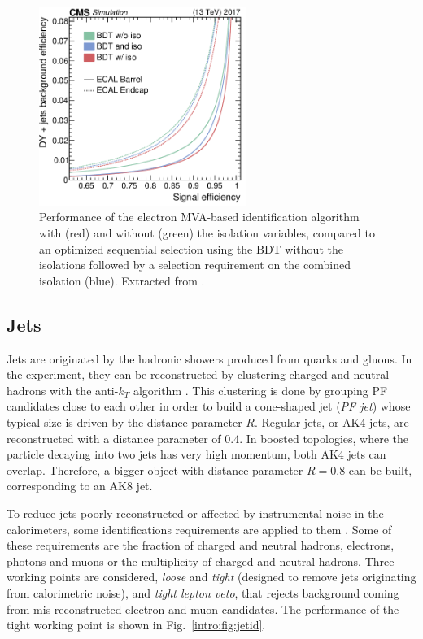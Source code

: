 \documentclass[../main.tex]{subfiles}
\begin{document}
\begin{figure}[h!]
\begin{center}
\includegraphics[width=0.6\textwidth]{Images/ele_mva}
\end{center}
\caption[Performance of the electron MVA-based identification algorithm]{Performance of the electron MVA-based identification algorithm with (red) and without (green) the isolation variables, compared to an optimized sequential selection using the BDT without the isolations followed by a selection requirement on the combined isolation (blue). Extracted from \cite{intro:id:ele_mva}.}
\label{intro:fig:ele_mva}
\end{figure}


\subsection{Jets}
\label{intro:subsec:jets}

Jets are originated by the hadronic showers produced from quarks and gluons. In the experiment, they can be reconstructed by clustering charged and neutral hadrons with the anti-$k_T$ algorithm \cite{intro:id:antikt}. This clustering is done by grouping PF candidates close to each other in order to build a cone-shaped jet (\textit{PF jet}) whose typical size is driven by the distance parameter $R$. Regular jets, or AK4 jets, are reconstructed with a distance parameter of 0.4. In boosted topologies, where the particle decaying into two jets has very high momentum, both AK4 jets can overlap. Therefore, a bigger object with distance parameter $R=0.8$ can be built, corresponding to an AK8 jet. 

To reduce jets poorly reconstructed or affected by instrumental noise in the calorimeters, some identifications requirements are applied to them \cite{intro:id:pfjetid}. Some of these requirements are the fraction of charged and neutral hadrons, electrons, photons and muons or the multiplicity of charged and neutral hadrons. Three working points are considered, \textit{loose} and \textit{tight} (designed to remove jets originating from calorimetric noise), and \textit{tight lepton veto}, that rejects background coming from mis-reconstructed electron and muon candidates. The performance of the tight working point is shown in Fig.~\ref{intro:fig:jetid}.
\end{document}
